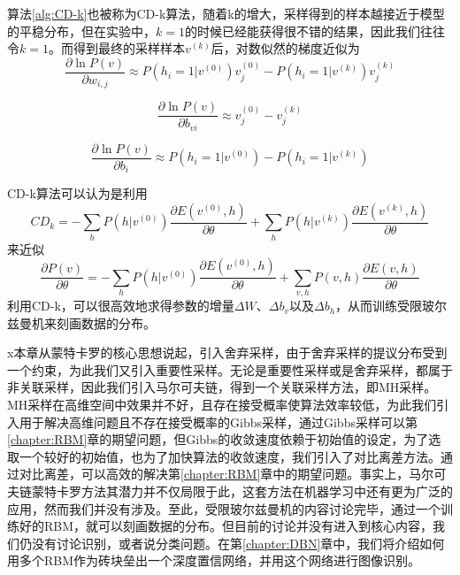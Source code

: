 算法\ref{alg:CD-k}也被称为CD-k算法，随着k的增大，采样得到的样本越接近于模型的平稳分布，但在实验中，$k=1$的时候已经能获得很不错的结果，因此我们往往令$k=1$。而得到最终的采样样本$v^{(k)}$后，对数似然的梯度近似为
\begin{equation}
\frac{\partial\ln P(v)}{\partial w_{i, j}} \approx
 P(h_i = 1 | v^{(0)})v_j^{(0)} - P(h_i = 1 | v^{(k)})v_j^{(k)}
 \label{equ:MAMAMA}
\end{equation}

\begin{equation}
\frac{\partial\ln P(v)}{\partial b_{vi}} \approx
v_j^{(0)} - v_j^{(k)}
\label{equ:MBMBMB}
\end{equation}

\begin{equation}
\frac{\partial\ln P(v)}{\partial b_{i}} \approx
 P(h_i = 1 | v^{(0)}) - P(h_i = 1 | v^{(k)})
 \label{equ:MCMCMC}
\end{equation}

CD-k算法可以认为是利用
\begin{equation}
CD_k = -\sum\limits_{h}P(h|v^{(0)})\frac{\partial E(v^{(0)} , h)}{\partial \theta} + \sum\limits_{h}P(h|v^{(k)})\frac{\partial E(v^{(k)} , h)}{\partial \theta}
\end{equation}
来近似
\begin{equation}
\frac{\partial P(v)}{\partial \theta} = -\sum\limits_{h}P(h|v^{(0)})\frac{\partial E(v^{(0)} , h)}{\partial \theta} + \sum\limits_{v, h}P(v, h)\frac{\partial E(v , h)}{\partial \theta}
\end{equation}
利用CD-k，可以很高效地求得参数的增量$\Delta W$、$\Delta b_v$以及$\Delta b_h$，从而训练受限玻尔兹曼机来刻画数据的分布。


x本章从蒙特卡罗的核心思想说起，引入舍弃采样，由于舍弃采样的提议分布受到一个约束，为此我们又引入重要性采样。无论是重要性采样或是舍弃采样，都属于非关联采样，因此我们引入马尔可夫链，得到一个关联采样方法，即MH采样。MH采样在高维空间中效果并不好，且存在接受概率使算法效率较低，为此我们引入用于解决高维问题且不存在接受概率的Gibbs采样，通过Gibbs采样可以第\ref{chapter:RBM}章的期望问题，但Gibbs的收敛速度依赖于初始值的设定，为了选取一个较好的初始值，也为了加快算法的收敛速度，我们引入了对比离差方法。通过对比离差，可以高效的解决第\ref{chapter:RBM}章中的期望问题。事实上，马尔可夫链蒙特卡罗方法其潜力并不仅局限于此，这套方法在机器学习中还有更为广泛的应用，然而我们并没有涉及。至此，受限玻尔兹曼机的内容讨论完毕，通过一个训练好的RBM，就可以刻画数据的分布。但目前的讨论并没有进入到核心内容，我们仍没有讨论识别，或者说分类问题。在第\ref{chapter:DBN}章中，我们将介绍如何用多个RBM作为砖块垒出一个深度置信网络，并用这个网络进行图像识别。









